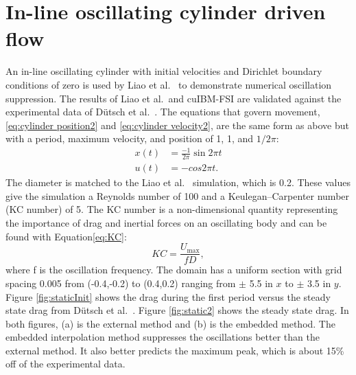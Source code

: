 \section{In-line oscillating cylinder driven flow}
\label{sec:Oscillating Cylinder in no Flow}
An in-line oscillating cylinder with initial velocities and Dirichlet boundary conditions of zero is used by Liao et al.~\cite{liao2010simulating} to demonstrate numerical oscillation suppression. 
The results of Liao et al.~and cuIBM-FSI are validated against the experimental data of D\"{u}tsch et al.~\cite{dutsch1998low}. 
The equations that govern movement, \eqref{eq:cylinder position2} and \eqref{eq:cylinder velocity2}, are the same form as above but with a period, maximum velocity, and position of 1, 1, and $1/2\pi$:
\begin{align}
x(t)&=\frac{-1}{2\pi}\sin{2\pi t}\label{eq:cylinder position2}\\
u(t)&=-cos{2\pi t}.\;\label{eq:cylinder velocity2}
\end{align}
The diameter is matched to the Liao et al.~\cite{liao2010simulating} simulation, which is 0.2. 
These values give the simulation a Reynolds number of 100 and a Keulegan–Carpenter number (KC number) of 5. 
The KC number is a non-dimensional quantity representing the importance of drag and inertial forces on an oscillating body and can be found with Equation\eqref{eq:KC}:
\begin{equation}
KC = \frac{U_\text{max}}{fD} \label{eq:KC},
\end{equation}
where f is the oscillation frequency. 
The domain has a uniform section with grid spacing 0.005 from (-0.4,-0.2) to (0.4,0.2) ranging from $\pm$ 5.5 in $x$ to $\pm$ 3.5 in $y$. 
Figure \ref{fig:staticInit} shows the drag during the first period versus the steady state drag from D\"{u}tsch et al.~\cite{dutsch1998low}. 
Figure \ref{fig:static2} shows the steady state drag. 
In both figures, (a) is the external method and (b) is the embedded method.
The embedded interpolation method suppresses the oscillations better than the external method. It also better predicts the maximum peak, which is about 15\% off of the experimental data.

